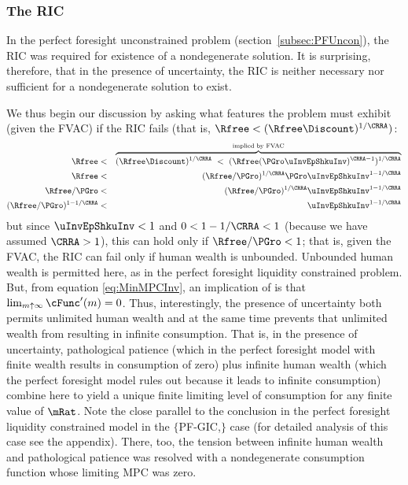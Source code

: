 \documentclass[titlepage]{\econtex}\providecommand{\texname}{BufferStockTheory}%
\begin{document}
\subsubsection{The RIC}

In the perfect foresight unconstrained problem
(section~\ref{subsec:PFUncon}), the RIC was required for existence of
a nondegenerate solution.  It is surprising, therefore, that in the
presence of uncertainty, the RIC is neither necessary nor sufficient
for a nondegenerate solution to exist.
\begin{comment}
But if the RIC does hold, some useful results can be derived.  Arguably
the most fundamental are that the limiting values
for the minimal and maximal marginal propensities to consume implicit in
\eqref{eq:MaxMPCDef} and \eqref{eq:MinMPCInv} are positive and finite.
\end{comment}
We thus begin our discussion by asking what features the problem must
exhibit (given the FVAC) if the RIC fails (that is, $\Rfree < (\Rfree \Discount)^{1/\CRRA})$:
\begin{eqnarray}
    \Rfree  & < & \overbrace{(\Rfree \Discount)^{1/\CRRA} ~ < ~ (\Rfree (\PGro \uInvEpShkuInv)^{\CRRA-1})^{1/\CRRA}}^{\text{implied by FVAC}} \notag
\\  \Rfree  & < & (\Rfree/\PGro)^{1/\CRRA}\PGro \uInvEpShkuInv^{1-1/\CRRA} \notag
\\  \Rfree/\PGro & < & (\Rfree/\PGro)^{1/\CRRA}\uInvEpShkuInv^{1-1/\CRRA} \notag
\\  (\Rfree/\PGro)^{1-1/\CRRA} & < & \uInvEpShkuInv^{1-1/\CRRA} \label{eq:RICimplies}
\end{eqnarray}
but since $\uInvEpShkuInv<1$ and $0 < 1-1/\CRRA < 1$ (because we have
assumed $\CRRA > 1$), this can hold only if $\Rfree/\PGro < 1$; that
is, given the FVAC, the RIC can fail only if human wealth is
unbounded.  Unbounded human wealth is permitted here, as in the
perfect foresight liquidity constrained problem.  But,
 from  equation
\eqref{eq:MinMPCInv}, an implication of  is that $\lim_{m
  \uparrow \infty} \cFunc^{\prime}(m) = 0$.  Thus, interestingly,
the presence of uncertainty both permits unlimited human wealth and at
the same time prevents that unlimited wealth from resulting in
infinite consumption.  That is, in the presence of uncertainty,
pathological patience (which in the perfect foresight model with
finite wealth results in consumption of zero) plus infinite human
wealth (which the perfect foresight model rules out because it leads
to infinite consumption) combine here to yield a unique finite
limiting level of consumption for any finite value of $\mRat$.  Note
the close parallel to the conclusion in the perfect foresight
liquidity constrained model in the
$\{$PF-GIC,$\}$ case (for detailed analysis of this
case see the appendix).  There, too, the tension between infinite human wealth
and pathological patience was resolved with a nondegenerate consumption function
whose limiting MPC was zero.
\end{document}
